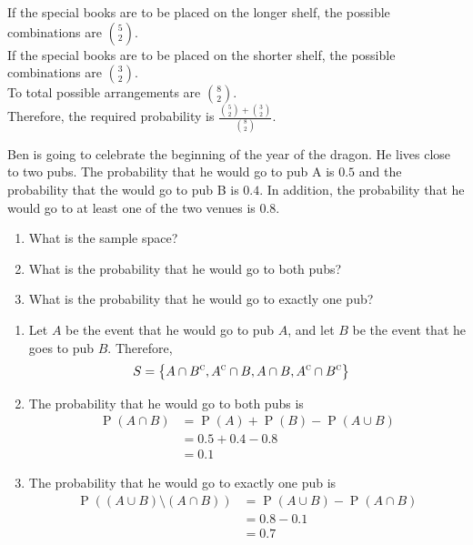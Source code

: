 \documentclass[titlepage, fleqn, a4paper, 12pt, twoside]{article}
\theoremstyle{definition}
\theoremstyle{theorem}
\DeclareMathOperator{\comp}{\textsc{c}}
\DeclareMathOperator{\prob}{\mathrm{P}}
\begin{document}
\begin{solution}
	If the special books are to be placed on the longer shelf, the possible combinations are $\binom{5}{2}$.\\
	If the special books are to be placed on the shorter shelf, the possible combinations are $\binom{3}{2}$.\\
	To total possible arrangements are $\binom{8}{2}$.\\
	Therefore, the required probability is $\frac{\binom{5}{2} + \binom{3}{2}}{\binom{8}{2}}$.
\end{solution}

\begin{question}
	Ben is going to celebrate the beginning of the year of the dragon.
	He lives close to two pubs.
	The probability that he would go to pub A is $0.5$ and the probability that the would go to pub B is $0.4$.
	In addition, the probability that he would go to at least one of the two venues is $0.8$.
	\begin{enumerate}
		\item What is the sample space?
		\item What is the probability that he would go to both pubs?
		\item What is the probability that he would go to exactly one pub?
	\end{enumerate}
\end{question}

\begin{solution}
	\begin{enumerate}[leftmargin=*]
		\item
			Let $A$ be the event that he would go to pub $A$, and let $B$ be the event that he goes to pub $B$.
			Therefore,
			\begin{align*}
				S & = \left\{ A \cap B^{\comp} , A^{\comp} \cap B , A \cap B , A^{\comp} \cap B^{\comp} \right\}
			\end{align*}
		\item
			The probability that he would go to both pubs is
			\begin{align*}
				\prob(A \cap B) & = \prob(A) + \prob(B) - \prob(A \cup B) \\
                                                & = 0.5 + 0.4 - 0.8                       \\
                                                & = 0.1
			\end{align*}
		\item
			The probability that he would go to exactly one pub is
			\begin{align*}
				\prob\left( (A \cup B) \setminus (A \cap B) \right) & = \prob(A \cup B) - \prob(A \cap B) \\
                                                                                    & = 0.8 - 0.1                         \\
                                                                                    & = 0.7
			\end{align*}
	\end{enumerate}
\end{solution}
\end{document}
